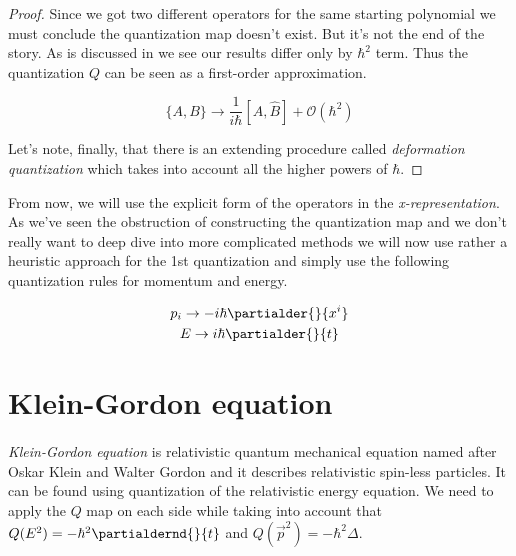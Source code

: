 \begin{proof}
    Since we got two different operators for the same starting polynomial we must conclude the quantization map doesn't exist. But
    it's not the end of the story. As is discussed in \cite{floarin_jung} we see our results differ only by $\hbar^{2}$ term. Thus
    the quantization $Q$ can be seen as a first-order approximation.

    \begin{equation}
        \label{eq:dirac_quantization}
        \{A, B\} \to \frac{1}{i \hbar}[\hat{A}, \hat{B}] + \mathcal{O}(\hbar^{2})
    \end{equation}

    Let's note, finally, that there is an extending procedure called \textit{deformation quantization} which takes into
    account all the higher powers of $\hbar$.

\end{proof}

From now, we will use the explicit form of the operators in the \textit{x-representation}. As we've seen the obstruction of
constructing the quantization map and we don't really want to deep dive into more complicated methods we will now use rather
a heuristic approach for the 1st quantization and simply use the following quantization rules for momentum and energy.

\begin{equation}
    \begin{gathered}
        p_{i} \to - i \hbar \partialder{}{x^{i}} \\
        E \to i \hbar \partialder{}{t}
    \end{gathered}
\end{equation}


\section{Klein-Gordon equation}

\paragraph{} \textit{Klein-Gordon equation} is relativistic quantum mechanical equation named after Oskar Klein and Walter Gordon and
it describes relativistic spin-less particles. It can be found using quantization of the relativistic energy equation. We need to apply the
$Q$ map on each side while taking into account that $Q(E^2) = - \hbar^{2} \partialdernd{}{t}$ and 
$Q(\vec{p}^2) = - \hbar^{2} \Delta$.

